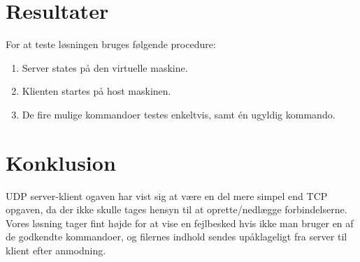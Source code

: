 \section{Resultater}
For at teste løsningen bruges følgende procedure:
\begin{enumerate}
    \item Server states på den virtuelle maskine.
    \item Klienten startes på host maskinen.
    \item De fire mulige kommandoer testes enkeltvis, samt én ugyldig kommando.
\end{enumerate}

\section{Konklusion}
UDP server-klient ogaven har vist sig at være en del mere simpel end TCP opgaven, da der ikke skulle tages hensyn til at oprette/nedlægge forbindelserne. Vores løsning tager fint højde for at vise en fejlbesked hvis ikke man bruger en af de godkendte kommandoer, og filernes indhold sendes upåklageligt fra server til klient efter anmodning.